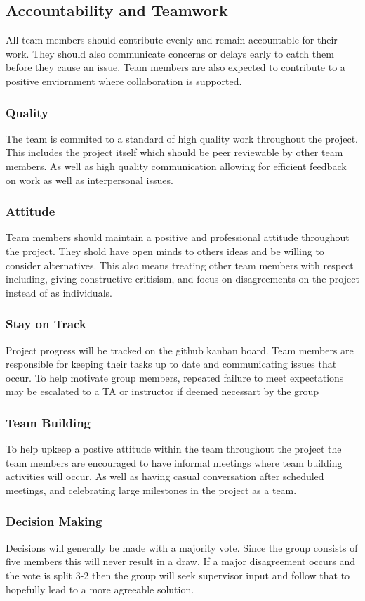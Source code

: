 \documentclass{article}
\begin{document}
\subsection*{Accountability and Teamwork}

All team members should contribute evenly and remain accountable for their work. They should also communicate concerns or delays early to catch them before they cause an issue.
Team members are also expected to contribute to a positive enviornment where collaboration is supported.

\subsubsection*{Quality} 

The team is commited to a standard of high quality work throughout the project. This includes the project itself which should be peer reviewable by other team members.
As well as high quality communication allowing for efficient feedback on work as well as interpersonal issues.

\subsubsection*{Attitude}

Team members should maintain a positive and professional attitude throughout the project. They shold have open minds to others ideas and be willing to consider alternatives.
This also means treating other team members with respect including, giving constructive critisism, and focus on disagreements on the project instead of as individuals.

\subsubsection*{Stay on Track}

Project progress will be tracked on the github kanban board. Team members are responsible for keeping their tasks up to date and communicating issues that occur.
To help motivate group members, repeated failure to meet expectations may be escalated to a TA or instructor if deemed necessart by the group 

\subsubsection*{Team Building}

To help upkeep a postive attitude within the team throughout the project the team members are encouraged to have informal meetings where team building activities will occur.
As well as having casual conversation after scheduled meetings, and celebrating large milestones in the project as a team.

\subsubsection*{Decision Making} 

Decisions will generally be made with a majority vote. Since the group consists of five members this will never result in a draw.
If a major disagreement occurs and the vote is split 3-2 then the group will seek supervisor input and follow that to hopefully lead to a more agreeable solution.
\end{document}
